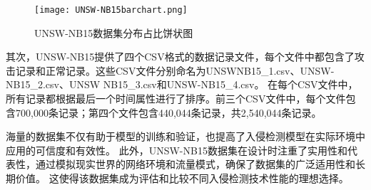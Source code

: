   
  \begin{figure}[htbp]
    \centering
    \texttt{[image: UNSW-NB15barchart.png]}
    \caption{UNSW-NB15数据集分布占比饼状图}
    \label{fig:UNSW-NB15barchart}
    \end{figure}


其次，UNSW-NB15提供了四个CSV格式的数据记录文件，每个文件中都包含了攻击记录和正常记录。这些CSV文件分别命名为UNSWNB15\_1.csv、UNSW-NB15\_2.csv、UNSW NB15\_3.csv和UNSW-NB15\_4.csv。
在每个CSV文件中，所有记录都根据最后一个时间属性进行了排序。前三个CSV文件中，每个文件包含700,000条记录；第四个文件包含440,044条记录，共2,540,044条记录。


海量的数据集不仅有助于模型的训练和验证，也提高了入侵检测模型在实际环境中应用的可信度和有效性。
此外，UNSW-NB15数据集在设计时注重了实用性和代表性，通过模拟现实世界的网络环境和流量模式，确保了数据集的广泛适用性和长期价值。
这使得该数据集成为评估和比较不同入侵检测技术性能的理想选择。
